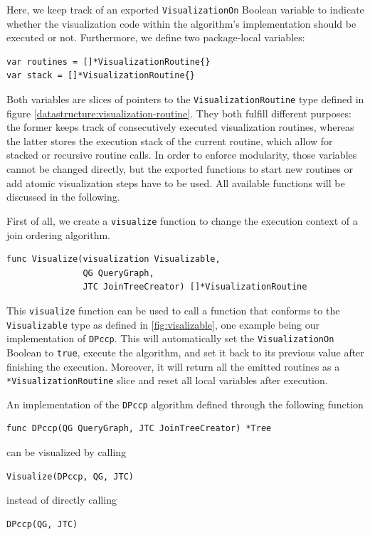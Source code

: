 Here, we keep track of an exported \texttt{VisualizationOn} Boolean variable to indicate whether the visualization code within the algorithm's implementation should be executed or not. Furthermore, we define two package-local variables:
\vspace{0.2cm}
\begin{verbatim}
var routines = []*VisualizationRoutine{}
var stack = []*VisualizationRoutine{}
\end{verbatim}
\vspace{0.2cm}
Both variables are slices of pointers to the \texttt{VisualizationRoutine} type defined in figure \ref{datastructure:visualization-routine}. They both fulfill different purposes: the former keeps track of consecutively executed visualization routines, whereas the latter stores the  execution stack of the current routine, which allow for stacked or recursive routine calls. In order to enforce modularity, those variables cannot be changed directly, but the exported functions to start new routines or add atomic visualization steps have to be used. All available functions will be discussed in the following.

First of all, we create a \texttt{visualize} function to change the execution context of a join ordering algorithm.
\begin{verbatim}
func Visualize(visualization Visualizable, 
               QG QueryGraph, 
               JTC JoinTreeCreator) []*VisualizationRoutine
\end{verbatim}

This \texttt{visualize} function can be used to call a function that conforms to the \texttt{Visualizable} type as defined in \ref{fig:visalizable}, one example being our implementation of \texttt{DPccp}. This will automatically set the \texttt{VisualizationOn} Boolean to \texttt{true}, execute the algorithm, and set it back to its previous value after finishing the execution. Moreover, it will return all the emitted routines as a \texttt{*VisualizationRoutine} slice and reset all local variables after execution.

\begin{example}
    An implementation of the \texttt{DPccp} algorithm defined through the following function
    \begin{verbatim}
func DPccp(QG QueryGraph, JTC JoinTreeCreator) *Tree
    \end{verbatim}
    can be visualized by calling
    \begin{verbatim}
Visualize(DPccp, QG, JTC)
    \end{verbatim}
    instead of directly calling
    \begin{verbatim}
DPccp(QG, JTC)
    \end{verbatim}
\end{example}

